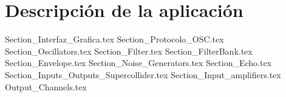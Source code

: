 \chapter{Descripción de la aplicación}

	{Section_Interfaz_Grafica.tex}
	{Section_Protocolo_OSC.tex}
	{Section_Oscillators.tex}
	{Section_Filter.tex}	
	{Section_FilterBank.tex}	
	{Section_Envelope.tex}	
	{Section_Noise_Generators.tex}
	{Section_Echo.tex}
	{Section_Inputs_Outputs_Supercollider.tex}
	{Section_Input_amplifiers.tex}
	{Output_Channels.tex}